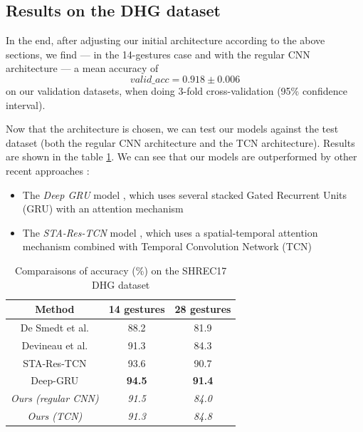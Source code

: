 \documentclass{article}
\begin{document}
\subsection{Results on the DHG dataset} \label{section:results}
In the end, after adjusting our initial architecture according to the above sections, we find — in the 14-gestures case and with the regular CNN architecture — a mean accuracy of
$$valid\_acc = 0.918 \pm 0.006$$
on our validation datasets, when doing 3-fold cross-validation (95\% confidence interval).
\par
Now that the architecture is chosen, we can test our models against the test dataset (both the regular CNN architecture and the TCN architecture).
Results are shown in the table \ref{tab:results}.
We can see that our models are outperformed by other recent approaches :
\begin{itemize}
    \item The \emph{Deep GRU} model \cite{Maghoumi-deep-gru}, which uses several stacked Gated Recurrent Units (GRU) with an attention mechanism
    \item The \emph{STA-Res-TCN} model \cite{STA-Res-TCN}, which uses a spatial-temporal attention mechanism combined with Temporal Convolution Network (TCN)
\end{itemize}

\begin{table}
    \centering
    \begin{tabular}{ccc}
        \toprule
        Method                                      & 14 gestures   & 28 gestures   \\ \midrule
        De Smedt et al. \cite{desmedt:shrec}        & 88.2          & 81.9 \\
        Devineau et al. \cite{Devineau}             & 91.3          & 84.3 \\
        STA-Res-TCN     \cite{STA-Res-TCN}          & 93.6          & 90.7 \\
        Deep-GRU        \cite{Maghoumi-deep-gru}    & \textbf{94.5} & \textbf{91.4} \\ \midrule
        \emph{Ours (regular CNN)}                   & \emph{91.5}   & \emph{84.0} \\
        \emph{Ours (TCN)}                           & \emph{91.3}   & \emph{84.8} \\
        \bottomrule
    \end{tabular}
    \caption{Comparaisons of accuracy (\%) on the SHREC17 DHG dataset}
    \label{tab:results}
\end{table}
\end{document}
